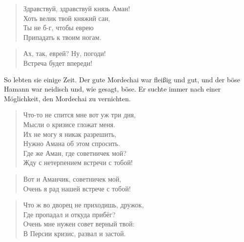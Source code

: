 \documentclass[12pt,a4paper,titlepage]{article}
\begin{document}
\begin{drama}
\mspeaks {}
\begin{verse}
Здравствуй, здравствуй князь Аман!\\
Хоть велик твой княжий сан,\\
Ты не б-г, чтобы еврею\\
Припадать к твоим ногам.\\
\end{verse}

\amspeaks
\begin{verse}
Ах, так, еврей? Ну, погоди!\\
Встреча будет впереди!\\
\end{verse}


\uespeaks
So lebten sie einige Zeit. Der gute Mordechai war fleißig und gut,
und der böse Hamann war neidisch und, wie gesagt, böse. Er suchte
immer nach einer Möglichkeit, den Mordechai zu vernichten.


\scene


\ahspeaks {}
\begin{verse}
Что-то не спится мне вот уж три дня,\\
Мысли о кризисе гложат меня.\\
Их не могу я никак разрешить,\\
Нужно Амана об этом спросить.\\
Где же Аман, где советничек мой?\\
Жду с нетерпением встречи с тобой!\\
\end{verse}


\ahspeaks
\begin{verse}
Вот и Аманчик, советничек мой,\\
Очень я рад нашей встрече с тобой!\\
\end{verse}


\ahspeaks
\begin{verse}
Что ж во дворец не приходишь, дружок,\\
Где пропадал и откуда прибёг?\\
Очень мне нужен совет верный твой:\\
В Персии кризис, развал и застой.\\
\end{verse}


\end{drama}
\end{document}
